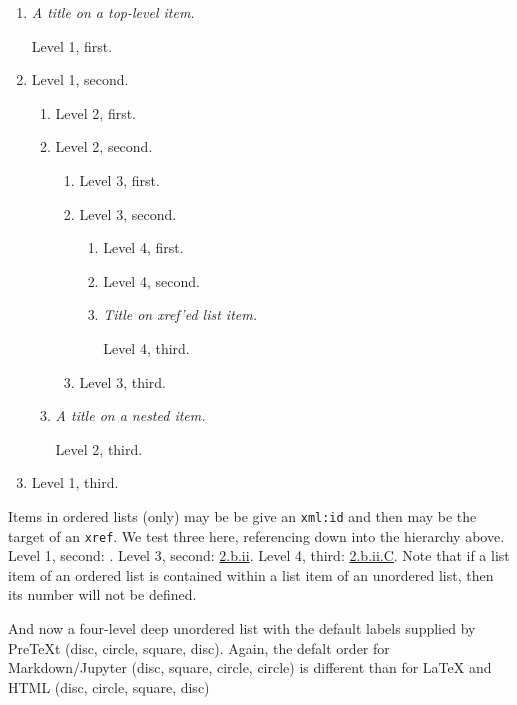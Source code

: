\documentclass{amsart}
\theoremstyle{plain}%
\theoremstyle{definition}%
\theoremstyle{remark}%
\newcommand{\xreffont}{\relax}
\newcommand{\mono}[1]{\texttt{#1}}
\newcommand{\lititle}[1]{{\slshape#1}}
\numberwithin{equation}{section}
\begin{document}
\begin{enumerate}
\item{}\lititle{A title on a top-level item.}\par%
Level 1, first.%
\item\hypertarget{list-two}{}Level 1, second.%
\begin{enumerate}
\item{}Level 2, first.%
\item{}Level 2, second.%
\begin{enumerate}
\item{}Level 3, first.%
\item\hypertarget{list-two-two-two}{}Level 3, second.%
\begin{enumerate}
\item{}Level 4, first.%
\item{}Level 4, second.%
\item\hypertarget{list-two-two-two-three}{}\lititle{Title on xref'ed list item.}\par%
Level 4, third.%
\end{enumerate}
%
\item{}Level 3, third.%
\end{enumerate}
%
\item{}\lititle{A title on a nested item.}\par%
Level 2, third.%
\end{enumerate}
%
\item{}Level 1, third.%
\end{enumerate}
%
\par
Items in ordered lists (only) may be be give an \mono{xml:id} and then may be the target of an \mono{xref}.  We test three here, referencing down into the hierarchy above.  Level 1, second: \hyperlink{list-two}{{\xreffont 2}}.  Level 3, second: \hyperlink{list-two-two-two}{{\xreffont 2.b.ii}}.  Level 4, third: \hyperlink{list-two-two-two-three}{{\xreffont 2.b.ii.C}}.  Note that if a list item of an ordered list is contained within a list item of an unordered list, then its number will not be defined.%
\par
And now a four-level deep unordered list with the default labels supplied by PreTeXt (disc, circle, square, disc).  Again, the defalt order for Markdown\slash{}Jupyter (disc, square, circle, circle) is different than for \LaTeX{} and HTML (disc, circle, square, disc)%
\end{document}
